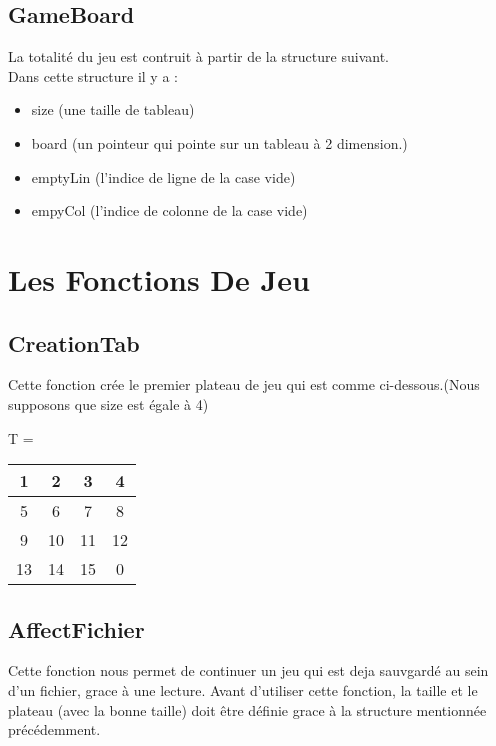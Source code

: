 \documentclass{article}
\begin{document}
\subsection{GameBoard}
La totalité du jeu est contruit à partir de la structure suivant.
\\
Dans cette structure il y a : \\

\begin{itemize}
	\item size (une taille de tableau)
	\item board (un pointeur qui pointe sur un tableau à 2 dimension.)
	\item emptyLin (l'indice de ligne de la case vide)
	\item empyCol (l'indice de colonne de la case vide)
\end{itemize}

\newpage

\section{Les Fonctions De Jeu}

\subsection{CreationTab}
Cette fonction crée le premier plateau de jeu qui est comme ci-dessous.(Nous supposons que size est égale à 4) \\

\begin{center}
	T =
	\begin{tabular}{|c|c|c|c|} \hline
	 1 & 2 & 3 & 4 \\  \hline
	 5 & 6 & 7 & 8 \\  \hline
	 9 & 10 & 11 & 12 \\ \hline
	13 & 14 & 15 & 0 \\ \hline
	\end{tabular}
\end{center}
 

\subsection{AffectFichier}
Cette fonction nous permet de continuer un jeu qui est deja sauvgardé au sein d'un fichier, grace à une lecture. Avant d'utiliser cette fonction, la taille et le plateau (avec la bonne taille) doit être définie grace à la structure mentionnée précédemment.
\end{document}
